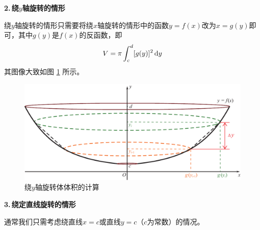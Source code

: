 \noindent \textbf{2.$\,$绕$y$轴旋转的情形}
\par 绕$y$轴旋转的情形只需要将绕$x$轴旋转的情形中的函数$y=f(x)$改为$x=g(y)$即可，其中$g(y)$是$f(x)$的反函数，即
\begin{equation}
	V=\pi\int_{c}^{d}[g(y)]^2\,{\rm{d}} y
\end{equation}
其图像大致如图 \ref{y旋转} 所示。
\begin{figure}[!htb]
	\centering
	\includegraphics[width=0.7\linewidth]{pic/C-4/y旋转体积}
	\vspace*{-1em}
	\caption{绕$y$轴旋转体体积的计算}
	\label{y旋转}
\end{figure}

\noindent \textbf{3.$\,$绕定直线旋转的情形}
\par 通常我们只需考虑绕直线$x=c$或直线$y=c$（$c$为常数）的情况。


